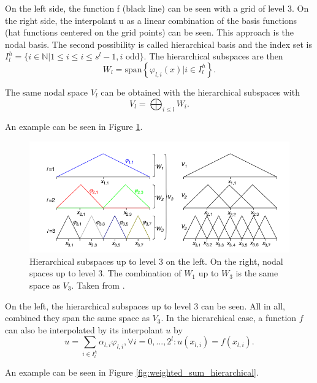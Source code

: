 On the left side, the function f (black line) can be seen with a grid of level 3. On the right side, the interpolant u as a linear combination of the basis functions (hat functions centered on the grid points) can be seen. This approach is the nodal basis. The second possibility is called hierarchical basis and the index set is $I_l^h = \{i \in \mathbb{N} | 1 \le i \le i \le s^l-1, i \text{ odd}\}$. The hierarchical subspaces are then 
\begin{equation}
	W_l = \text{span}\left\{ \varphi_{l,i}(x) | i \in I_l^h\right\}.
\end{equation}

The same nodal space $ V_l $ can be obtained with the hierarchical subspaces with 
\begin{equation}
	V_l = \bigoplus_{i \le l} W_i.
\end{equation}

An example can be seen in Figure \ref{fig:hierarchical_basis}.
\begin{figure}[ht]
	\centering
	\includegraphics[scale=0.5]{figures/hierarchical_basis.png}
	\caption{ Hierarchical subspaces up to level 3 on the left. On the right, nodal spaces up to level 3. The combination of $ W_1 $ up to $ W_3 $ is the same space as $ V_3 $. Taken from \cite{pfluger2010spatially}. }
	\label{fig:hierarchical_basis}
\end{figure}

On the left, the hierarchical subspaces up to level 3 can be seen. All in all, combined they span the same space as $ V_3 $. In the hierarchical case, a function $ f $ can also be interpolated by its interpolant $ u $ by 
\begin{equation}
	u = \sum_{i \in I_l^h}\alpha_{l,i} \varphi_{l,i}, \forall i = 0,...,2^l: u(x_{l,i}) = f(x_{l,i}).
\end{equation}

An example can be seen in Figure \ref{fig:weighted_sum_hierarchical}.

